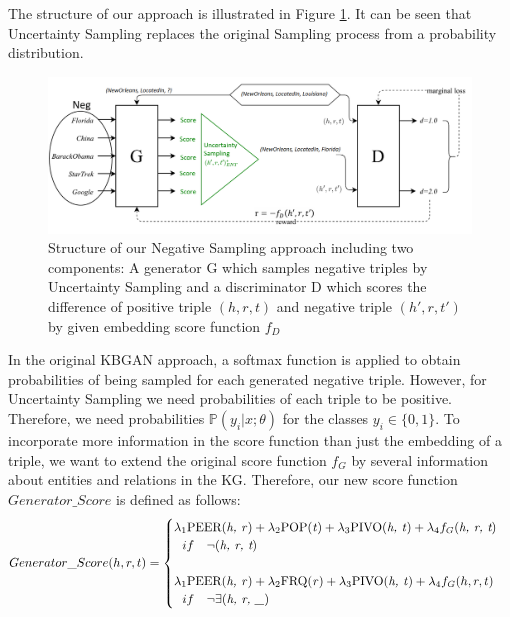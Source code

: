 The structure of our approach is illustrated in Figure \ref{fig:architecture}.
It can be seen that Uncertainty Sampling replaces the original Sampling process from a probability distribution.
\begin{figure}
    \centering
    \includegraphics[width=\textwidth]{figures/architecture.png}
    \caption{Structure of our Negative Sampling approach including two components:
    A generator G which samples negative triples by Uncertainty Sampling and a discriminator D which scores the difference of positive triple $(h,r,t)$ and negative triple $(h',r,t')$ by given embedding score function $f_D$}
    \label{fig:architecture}
\end{figure}
In the original \ac{KBGAN} approach, a softmax function is applied to obtain probabilities of being sampled for each generated negative triple.
However, for Uncertainty Sampling we need probabilities of each triple to be positive. 
Therefore, we need probabilities $\mathds{P}(y_i | x; \theta)$ for the classes $y_i \in \{0, 1\}$.
To incorporate more information in the score function than just the embedding of a triple, we want to extend the original score function $f_G$ by several information about entities and relations in the \ac{KG}.
Therefore, our new score function $Generator\_Score$ is defined as follows:
\begin{equation}
    Generator\_Score(h, r, t)=
    \begin{cases}
         \lambda_1 \text{PEER(\textit{h, r})} + \lambda_2 \text{POP(\textit{t})} + \lambda_3 \text{PIVO(\textit{h, t})} + \lambda_4 f_G(\textit{h, r, t})
         \\ \ \ 
         if\ \ \ \neg(\textit{h, r, t})
         \\ \\
         \lambda_1 \text{PEER(\textit{h, r})} + \lambda_2 \text{FRQ(\textit{r})} + \lambda_3 \text{PIVO(\textit{h, t})} + \lambda_4 f_G(h, r, t)
         \\ \ \ 
         if\ \ \ \neg \exists (\textit{h, r, \_})
         \\
    \end{cases}
\end{equation}
